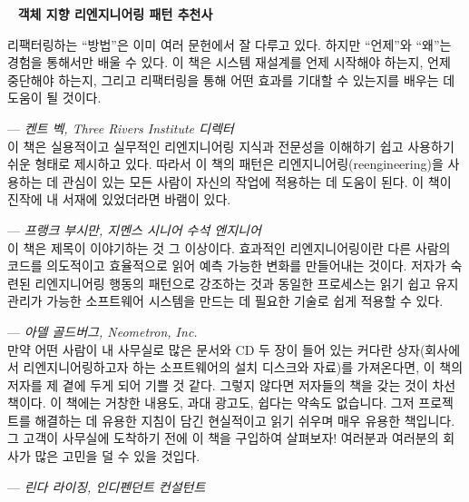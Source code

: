 \documentclass[a4paper,10pt,twoside]{book}
\begin{document}
	\frontmatter
	\sloppy
\fi
~ %
\vfill
\noindent
{\large \bf 객체 지향 리엔지니어링 패턴 추천사}

\vspace{1cm}

\noindent
리팩터링하는 ``방법''은 이미 여러 문헌에서 잘 다루고 있다. 하지만 ``언제''와 ``왜''는 경험을 통해서만 배울 수 있다. 이 책은 시스템 재설계를 언제 시작해야 하는지, 언제 중단해야 하는지, 그리고 리팩터링을 통해 어떤 효과를 기대할 수 있는지를 배우는 데 도움이 될 것이다.

\hfill--- \emph{켄트 벡, Three Rivers Institute 디렉터}\\[0.2cm]

\noindent
이 책은 실용적이고 실무적인 리엔지니어링 지식과 전문성을 이해하기 쉽고 사용하기 쉬운 형태로 제시하고 있다. 따라서 이 책의 패턴은 리엔지니어링(reengineering)을 사용하는 데 관심이 있는 모든 사람이 자신의 작업에 적용하는 데 도움이 된다. 이 책이 진작에 내 서재에 있었더라면 바램이 있다.

\hfill--- \emph{프랭크 부시만, 지멘스 시니어 수석 엔지니어}\\[0.2cm]

\noindent
이 책은 제목이 이야기하는 것 그 이상이다. 효과적인 리엔지니어링이란 다른 사람의 코드를 의도적이고 효율적으로 읽어 예측 가능한 변화를 만들어내는 것이다. 저자가 숙련된 리엔지니어링 행동의 패턴으로 강조하는 것과 동일한 프로세스는 읽기 쉽고 유지 관리가 가능한 소프트웨어 시스템을 만드는 데 필요한 기술로 쉽게 적용할 수 있다.

\hfill--- \emph{아델 골드버그, Neometron, Inc.}\\[0.2cm]

\noindent
만약 어떤 사람이 내 사무실로 많은 문서와 CD 두 장이 들어 있는 커다란 상자(회사에서 리엔지니어링하고자 하는 소프트웨어의 설치 디스크와 자료)를 가져온다면, 이 책의 저자를 제 곁에 두게 되어 기쁠 것 같다. 그렇지 않다면 저자들의 책을 갖는 것이 차선책이다. 이 책에는 거창한 내용도, 과대 광고도, 쉽다는 약속도 없습니다. 그저 프로젝트를 해결하는 데 유용한 지침이 담긴 현실적이고 읽기 쉬우며 매우 유용한 책입니다. 그 고객이 사무실에 도착하기 전에 이 책을 구입하여 살펴보자! 여러분과 여러분의 회사가 많은 고민을 덜 수 있을 것입다.

\hfill--- \emph{린다 라이징, 인디펜던트 컨설턴트}

\vfill

\ifx\wholebook\relax\else
   
   
   
\end{document}
